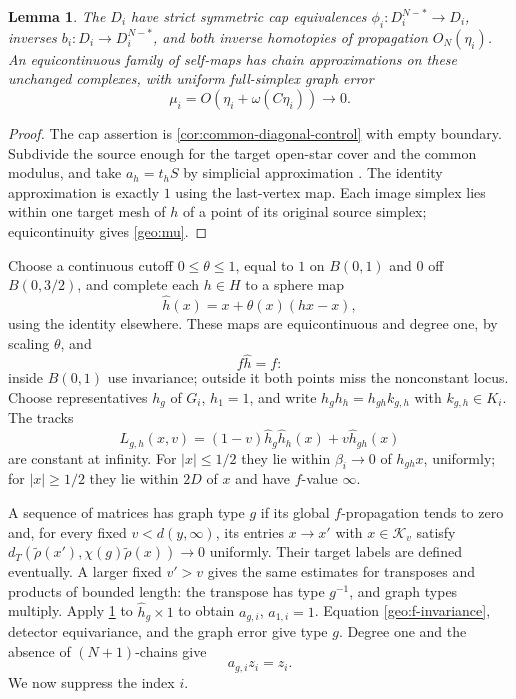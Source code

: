 \documentclass[11pt]{amsart}
\numberwithin{equation}{section}
\newtheorem{lemma}[lemma]{Lemma}
\theoremstyle{definition}
\theoremstyle{remark}
\begin{document}
\begin{lemma}\label{geo:closed-models}
The $D_i$ have strict symmetric cap equivalences
$\phi_i:D_i^{N-*}\to D_i$, inverses $b_i:D_i\to D_i^{N-*}$,
and both inverse homotopies of propagation $O_N(\eta_i)$. An
equicontinuous family of self-maps has chain approximations on these
unchanged complexes, with uniform full-simplex graph error
\begin{equation}\label{geo:mu}
\mu_i=O(\eta_i+\omega(C\eta_i))\longrightarrow0.
\end{equation}
\end{lemma}
\begin{proof}
The cap assertion is \cref{cor:common-diagonal-control} with empty
boundary. Subdivide the source enough for the target open-star cover
and the common modulus, and take $a_h=t_hS$ by simplicial approximation
\cite[Theorem 2C.1]{Hat02}. The identity approximation is exactly $1$
using the last-vertex map. Each image simplex lies within one target
mesh of $h$ of a point of its original source simplex; equicontinuity
gives \eqref{geo:mu}.
\end{proof}

Choose a continuous cutoff $0\le\theta\le1$, equal to $1$ on $B(0,1)$
and $0$ off $B(0,3/2)$, and complete each $h\in H$ to a sphere map
\begin{equation}\label{geo:completed-map}
 \widehat h(x)=x+\theta(x)(hx-x),
\end{equation}
using the identity elsewhere. These maps are equicontinuous and degree
one, by scaling $\theta$, and
\begin{equation}\label{geo:f-invariance}
 f\widehat h=f:
\end{equation}
inside $B(0,1)$ use invariance; outside it both points miss the
nonconstant locus. Choose representatives $h_g$ of $G_i$, $h_1=1$, and
write $h_gh_h=h_{gh}k_{g,h}$ with $k_{g,h}\in K_i$. The tracks
\begin{equation}\label{geo:raw-product-track}
 L_{g,h}(x,v)=(1-v)\widehat h_g\widehat h_h(x)+v\widehat h_{gh}(x)
\end{equation}
are constant at infinity. For $|x|\le1/2$ they lie within
$\beta_i\to0$ of $h_{gh}x$, uniformly; for $|x|\ge1/2$ they lie within
$2D$ of $x$ and have $f$-value $\infty$.

A sequence of matrices has graph type $g$ if its global $f$-propagation
tends to zero and, for every fixed $v<d(y,\infty)$, its entries $x\to x'$ with
$x\in\mathcal K_v$ satisfy
$d_T(\widetilde\rho(x'),\chi(g)\widetilde\rho(x))\to0$ uniformly.
Their target labels are defined eventually. A larger fixed $v'>v$ gives
the same estimates for transposes and products of bounded length: the transpose
has type $g^{-1}$, and graph types multiply.
Apply \cref{geo:closed-models} to $\widehat h_g\times1$ to obtain
$a_{g,i}$, $a_{1,i}=1$.
Equation \eqref{geo:f-invariance}, detector equivariance, and the graph
error give type $g$. Degree one and the absence of $(N+1)$-chains give
\begin{equation}\label{geo:fundamental-cycle}
 a_{g,i}z_i=z_i.
\end{equation}
We now suppress the index $i$.
\end{document}
